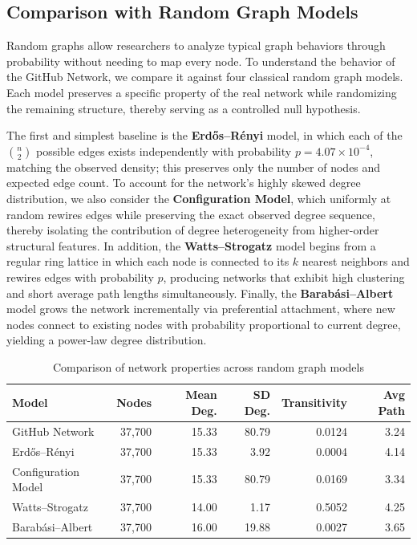 \documentclass[letterpaper]{article}
\begin{document}
\subsection{Comparison with Random Graph Models}
Random graphs allow researchers to analyze typical graph behaviors through probability without needing to map every node. To understand the behavior of the GitHub Network, we compare it against four classical random graph models. Each model preserves a specific property of the real network while randomizing the remaining structure, thereby serving as a controlled null hypothesis.

The first and simplest baseline is the \textbf{Erd\H{o}s--R{\'e}nyi} model, in which each of the $\binom{n}{2}$ possible edges exists independently with probability $p = 4.07 \times 10^{-4}$, matching the observed density; this preserves only the number of nodes and expected edge count. To account for the network's highly skewed degree distribution, we also consider the \textbf{Configuration Model}, which uniformly at random rewires edges while preserving the exact observed degree sequence, thereby isolating the contribution of degree heterogeneity from higher-order structural features. In addition, the \textbf{Watts--Strogatz} model \cite{watts1998smallworld} begins from a regular ring lattice in which each node is connected to its $k$ nearest neighbors and rewires edges with probability $p$, producing networks that exhibit high clustering and short average path lengths simultaneously. Finally, the \textbf{Barab{\'a}si--Albert} model grows the network incrementally via preferential attachment, where new nodes connect to existing nodes with probability proportional to current degree, yielding a power-law degree distribution.

\begin{table}[H]
  \centering
  \begin{tabular}{l|rrrrr}
    \hline
    \textbf{Model} & \textbf{Nodes} & \textbf{Mean Deg.} & \textbf{SD Deg.} & \textbf{Transitivity} & \textbf{Avg Path} \\
    \hline
    GitHub Network        & 37,700 & 15.33 & 80.79 & 0.0124 & 3.24 \\
    Erd\H{o}s--R{\'e}nyi & 37,700 & 15.33 & 3.92  & 0.0004 & 4.14 \\
    Configuration Model   & 37,700 & 15.33 & 80.79 & 0.0169 & 3.34 \\
    Watts--Strogatz       & 37,700 & 14.00 & 1.17  & 0.5052 & 4.25 \\
    Barab{\'a}si--Albert  & 37,700 & 16.00 & 19.88 & 0.0027 & 3.65 \\
    \hline
  \end{tabular}
  \caption{Comparison of network properties across random graph models}
  \label{tab:model_comparison}
\end{table}
\end{document}
